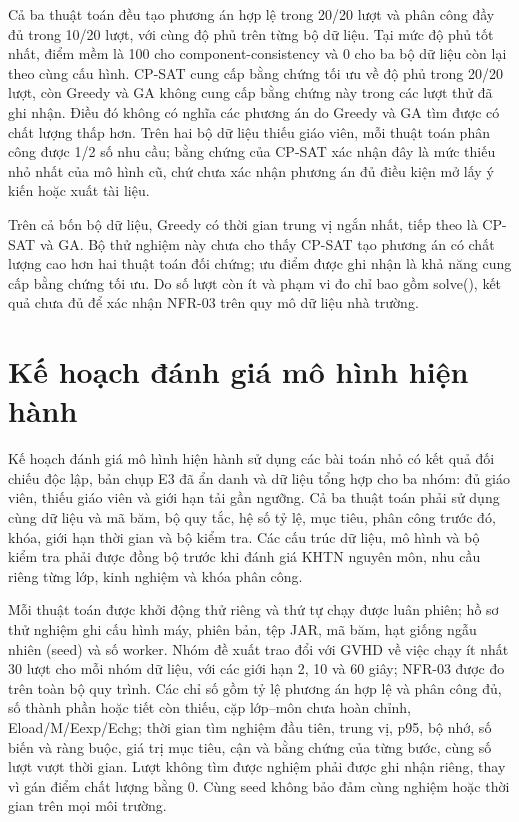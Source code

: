 \documentclass[12pt,a4paper]{report}
\begin{document}
Cả ba thuật toán đều tạo phương án hợp lệ trong 20/20 lượt và phân công đầy đủ trong 10/20 lượt, với cùng độ phủ trên từng bộ dữ liệu. Tại mức độ phủ tốt nhất, điểm mềm là 100 cho component-consistency và 0 cho ba bộ dữ liệu còn lại theo cùng cấu hình. CP-SAT cung cấp bằng chứng tối ưu về độ phủ trong 20/20 lượt, còn Greedy và GA không cung cấp bằng chứng này trong các lượt thử đã ghi nhận. Điều đó không có nghĩa các phương án do Greedy và GA tìm được có chất lượng thấp hơn. Trên hai bộ dữ liệu thiếu giáo viên, mỗi thuật toán phân công được 1/2 số nhu cầu; bằng chứng của CP-SAT xác nhận đây là mức thiếu nhỏ nhất của mô hình cũ, chứ chưa xác nhận phương án đủ điều kiện mở lấy ý kiến hoặc xuất tài liệu.

Trên cả bốn bộ dữ liệu, Greedy có thời gian trung vị ngắn nhất, tiếp theo là CP-SAT và GA. Bộ thử nghiệm này chưa cho thấy CP-SAT tạo phương án có chất lượng cao hơn hai thuật toán đối chứng; ưu điểm được ghi nhận là khả năng cung cấp bằng chứng tối ưu. Do số lượt còn ít và phạm vi đo chỉ bao gồm solve(), kết quả chưa đủ để xác nhận NFR-03 trên quy mô dữ liệu nhà trường.

\section{Kế hoạch đánh giá mô hình hiện hành}
Kế hoạch đánh giá mô hình hiện hành sử dụng các bài toán nhỏ có kết quả đối chiếu độc lập, bản chụp E3 đã ẩn danh và dữ liệu tổng hợp cho ba nhóm: đủ giáo viên, thiếu giáo viên và giới hạn tải gần ngưỡng. Cả ba thuật toán phải sử dụng cùng dữ liệu và mã băm, bộ quy tắc, hệ số tỷ lệ, mục tiêu, phân công trước đó, khóa, giới hạn thời gian và bộ kiểm tra. Các cấu trúc dữ liệu, mô hình và bộ kiểm tra phải được đồng bộ trước khi đánh giá KHTN nguyên môn, nhu cầu riêng từng lớp, kinh nghiệm và khóa phân công.

Mỗi thuật toán được khởi động thử riêng và thứ tự chạy được luân phiên; hồ sơ thử nghiệm ghi cấu hình máy, phiên bản, tệp JAR, mã băm, hạt giống ngẫu nhiên (seed) và số worker. Nhóm đề xuất trao đổi với GVHD về việc chạy ít nhất 30 lượt cho mỗi nhóm dữ liệu, với các giới hạn 2, 10 và 60 giây; NFR-03 được đo trên toàn bộ quy trình. Các chỉ số gồm tỷ lệ phương án hợp lệ và phân công đủ, số thành phần hoặc tiết còn thiếu, cặp lớp--môn chưa hoàn chỉnh, Eload/M/Eexp/Echg; thời gian tìm nghiệm đầu tiên, trung vị, p95, bộ nhớ, số biến và ràng buộc, giá trị mục tiêu, cận và bằng chứng của từng bước, cùng số lượt vượt thời gian. Lượt không tìm được nghiệm phải được ghi nhận riêng, thay vì gán điểm chất lượng bằng 0. Cùng seed không bảo đảm cùng nghiệm hoặc thời gian trên mọi môi trường.
\end{document}
